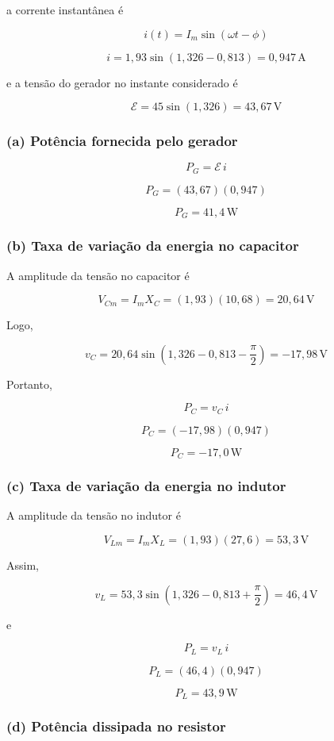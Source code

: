 \documentclass[12pt,a4paper]{article}
\begin{document}
a corrente instantânea é

\[
i(t)
=
I_m\sin(\omega t-\phi)
\]

\[
i
=
1,93\sin(1,326-0,813)
=
0,947\,\text{A}
\]

e a tensão do gerador no instante considerado é

\[
\mathcal{E}
=
45\sin(1,326)
=
43,67\,\text{V}
\]

\subsubsection*{(a) Potência fornecida pelo gerador}

\[
P_G
=
\mathcal{E}\,i
\]

\[
P_G
=
(43,67)(0,947)
\]

\[
\boxed{P_G=41,4\,\text{W}}
\]

\subsubsection*{(b) Taxa de variação da energia no capacitor}

A amplitude da tensão no capacitor é

\[
V_{Cm}=I_mX_C
=(1,93)(10,68)
=20,64\,\text{V}
\]

Logo,

\[
v_C
=
20,64
\sin\!\left(
1,326-0,813-\frac{\pi}{2}
\right)
=
-17,98\,\text{V}
\]

Portanto,

\[
P_C=v_C\,i
\]

\[
P_C
=
(-17,98)(0,947)
\]

\[
\boxed{P_C=-17,0\,\text{W}}
\]

\subsubsection*{(c) Taxa de variação da energia no indutor}

A amplitude da tensão no indutor é

\[
V_{Lm}
=
I_mX_L
=
(1,93)(27,6)
=
53,3\,\text{V}
\]

Assim,

\[
v_L
=
53,3
\sin\!\left(
1,326-0,813+\frac{\pi}{2}
\right)
=
46,4\,\text{V}
\]

e

\[
P_L=v_L\,i
\]

\[
P_L
=
(46,4)(0,947)
\]

\[
\boxed{P_L=43,9\,\text{W}}
\]

\subsubsection*{(d) Potência dissipada no resistor}
\end{document}
